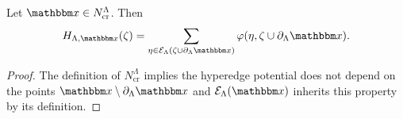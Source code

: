 \begin{proposition}Let $\x\in N^\Lambda_\text{cr}$. Then 
	$$H_{\Lambda,\x}(\zeta) = \sum_{\eta \in \mathcal E_\Lambda(\zeta \cup \partial_\Lambda \x)} \varphi(\eta, \zeta \cup \partial_\Lambda \x).$$
\end{proposition}
\begin{proof} The definition of $N^\Lambda_\text{cr}$ implies the hyperedge potential does not depend on the points $\x \setminus \partial_\Lambda \x$ and $\mathcal E_\Lambda(\x)$ inherits this property by its definition.
\end{proof}




